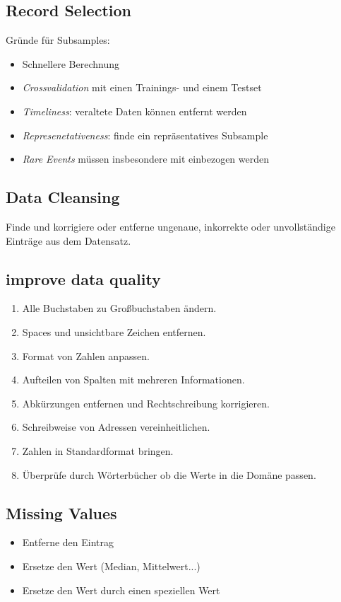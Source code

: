 \documentclass[a4paper]{scrartcl}
\begin{document}
\subsection{Record Selection}
Gründe für Subsamples:
\begin{itemize}
\item Schnellere Berechnung
\item \textit{Crossvalidation} mit einen Trainings- und einem Testset
\item \textit{Timeliness}: veraltete Daten können entfernt werden
\item \textit{Represenetativeness}: finde ein repräsentatives Subsample
\item \textit{Rare Events} müssen insbesondere mit einbezogen werden
\end{itemize}

\subsection{Data Cleansing}
Finde und korrigiere oder entferne ungenaue, inkorrekte oder unvollständige Einträge aus dem Datensatz.
\subsection{improve data quality}
\begin{enumerate}
\setlength{\parskip}{0pt}
\item Alle Buchstaben zu Großbuchstaben ändern.
\item Spaces und unsichtbare Zeichen entfernen.
\item Format von Zahlen anpassen.
\item Aufteilen von Spalten mit mehreren Informationen.
\item Abkürzungen entfernen und Rechtschreibung korrigieren.
\item Schreibweise von Adressen vereinheitlichen.
\item Zahlen in Standardformat bringen.
\item Überprüfe durch Wörterbücher ob die Werte in die Domäne passen.
\end{enumerate}

\subsection{Missing Values}
\begin{itemize}
\item Entferne den Eintrag
\item Ersetze den Wert (Median, Mittelwert...)
\item Ersetze den Wert durch einen speziellen Wert
\end{itemize}
\end{document}
